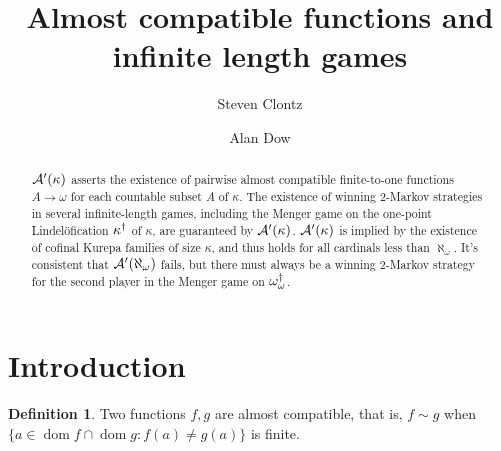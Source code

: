 \documentclass{amsart}
\theoremstyle{plain}
\theoremstyle{definition}
\newtheorem{definition}[theorem]{Definition}
\theoremstyle{remark}
\theoremstyle{plain}
\theoremstyle{definition}
\theoremstyle{remark}
\def\dom{\mathop{dom}}
\begin{document}
\title{Almost compatible functions and infinite length games}




\author{Steven Clontz}
\address{Department of Mathematics and Statistics, UNC Charlotte,
Charlotte, NC 28262}
\author{Alan Dow}
\address{Department of Mathematics and Statistics, UNC Charlotte,
Charlotte, NC 28262}







\begin{abstract}
  \(\mathcal{A}'(\kappa)\) asserts the existence of pairwise
  almost compatible finite-to-one functions \(A\to\omega\) for each
  countable subset \(A\) of \(\kappa\).
  The existence of winning \(2\)-Markov strategies in
  several infinite-length games, including
  the Menger game on the one-point Lindel\"ofication \(\kappa^\dagger\)
  of \(\kappa\), are guaranteed by \(\mathcal{A}'(\kappa)\). \(\mathcal{A}'(\kappa)\) is
  implied by the existence of cofinal Kurepa families of size \(\kappa\),
  and thus holds for all cardinals less than \(\aleph_\omega\).
  It's consistent that \(\mathcal{A}'(\aleph_\omega)\) fails, but
  there must always be a winning \(2\)-Markov strategy for the second
  player in the Menger game on \(\omega_\omega^\dagger\).
\end{abstract}


\maketitle
{}






\section{Introduction}

  \begin{definition}
    Two functions \(f,g\) are almost compatible, that is, \(f\sim g\) when
    \(\{a\in\dom f\cap\dom g:f(a)\not=g(a)\}\) is finite.
  \end{definition}
\end{document}
